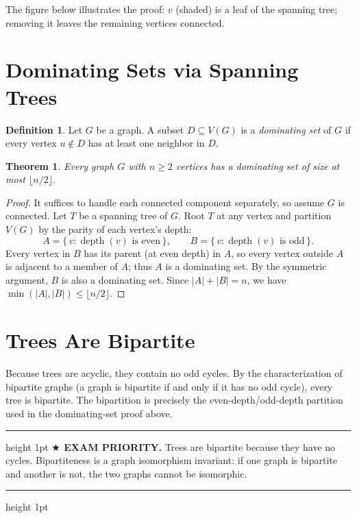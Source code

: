 \documentclass[11pt]{article}
\newtheorem{theorem}{Theorem}
\theoremstyle{definition}
\newtheorem*{definition*}{Definition}
\newenvironment{exambox}
  {\par\medskip\noindent\begin{center}\begin{minipage}{0.92\textwidth}%
   \hrule height 1pt \vspace{4pt}\noindent\textbf{$\bigstar$ EXAM PRIORITY.} }
  {\vspace{4pt}\hrule height 1pt \end{minipage}\end{center}\medskip}
\begin{document}
The figure below illustrates the proof: $v$ (shaded) is a leaf of the
spanning tree; removing it leaves the remaining vertices connected.

\begin{center}
\end{center}

\section*{Dominating Sets via Spanning Trees}

\begin{definition*}
Let $G$ be a graph.  A subset $D\subseteq V(G)$ is a \emph{dominating set}
of $G$ if every vertex $u\notin D$ has at least one neighbor in $D$.
\end{definition*}

\begin{theorem}
Every graph $G$ with $n\geq 2$ vertices has a dominating set of size at
most $\lfloor n/2\rfloor$.
\end{theorem}

\begin{proof}
It suffices to handle each connected component separately, so assume $G$ is
connected.  Let $T$ be a spanning tree of $G$.  Root $T$ at any vertex and
partition $V(G)$ by the parity of each vertex's depth:
\[
  A = \{\,v : \operatorname{depth}(v)\text{ is even}\,\},\qquad
  B = \{\,v : \operatorname{depth}(v)\text{ is odd}\,\}.
\]
Every vertex in $B$ has its parent (at even depth) in $A$, so every vertex
outside $A$ is adjacent to a member of $A$; thus $A$ is a dominating set.
By the symmetric argument, $B$ is also a dominating set.  Since
$|A|+|B|=n$, we have $\min(|A|,|B|)\leq\lfloor n/2\rfloor$.
\end{proof}

\section*{Trees Are Bipartite}

Because trees are acyclic, they contain no odd cycles.  By the
characterization of bipartite graphs (a graph is bipartite if and only if
it has no odd cycle), every tree is bipartite.  The bipartition is
precisely the even-depth/odd-depth partition used in the dominating-set
proof above.

\begin{exambox}
Trees are bipartite because they have no cycles.  Bipartiteness is a graph
isomorphism invariant: if one graph is bipartite and another is not, the
two graphs cannot be isomorphic.
\end{exambox}
\end{document}
